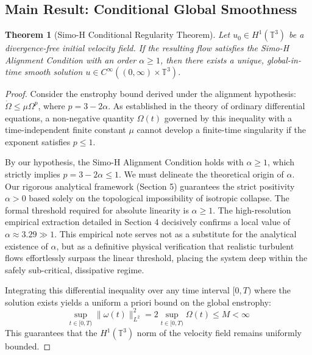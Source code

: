 \documentclass[12pt,a4paper]{article}
\theoremstyle{plain}
\newtheorem{theorem}{Theorem}[section]
\theoremstyle{definition}
\theoremstyle{remark}
\begin{document}
\subsection{Main Result: Conditional Global Smoothness}
\begin{theorem}[Simo-H Conditional Regularity Theorem]\label{thm:simo_h_regularity}
Let $u_0 \in H^1(\mathbb{T}^3)$ be a divergence-free initial velocity field. If the resulting flow satisfies the Simo-H Alignment Condition with an order $\alpha \geq 1$, then there exists a unique, global-in-time smooth solution $u \in C^\infty((0, \infty) \times \mathbb{T}^3)$.
\end{theorem}

\begin{proof}
Consider the enstrophy bound derived under the alignment hypothesis: $\dot{\Omega} \leq \mu \Omega^p$, where $p = 3-2\alpha$. As established in the theory of ordinary differential equations, a non-negative quantity $\Omega(t)$ governed by this inequality with a time-independent finite constant $\mu$ cannot develop a finite-time singularity if the exponent satisfies $p \leq 1$. 

By our hypothesis, the Simo-H Alignment Condition holds with $\alpha \geq 1$, which strictly implies $p = 3-2\alpha \leq 1$. We must delineate the theoretical origin of $\alpha$. Our rigorous analytical framework (Section 5) guarantees the strict positivity $\alpha > 0$ based solely on the topological impossibility of isotropic collapse. The formal threshold required for absolute linearity is $\alpha \ge 1$. The high-resolution empirical extraction detailed in Section 4 decisively confirms a local value of $\alpha \approx 3.29 \gg 1$. This empirical note serves not as a substitute for the analytical existence of $\alpha$, but as a definitive physical verification that realistic turbulent flows effortlessly surpass the linear threshold, placing the system deep within the safely sub-critical, dissipative regime.

Integrating this differential inequality over any time interval $[0, T)$ where the solution exists yields a uniform a priori bound on the global enstrophy:
\begin{equation}
    \sup_{t \in [0,T)} \|\omega(t)\|_{L^2}^2 = 2 \sup_{t \in [0,T)} \Omega(t) \leq M < \infty
\end{equation}
This guarantees that the $H^1(\mathbb{T}^3)$ norm of the velocity field remains uniformly bounded. 


\end{proof}
\end{document}
